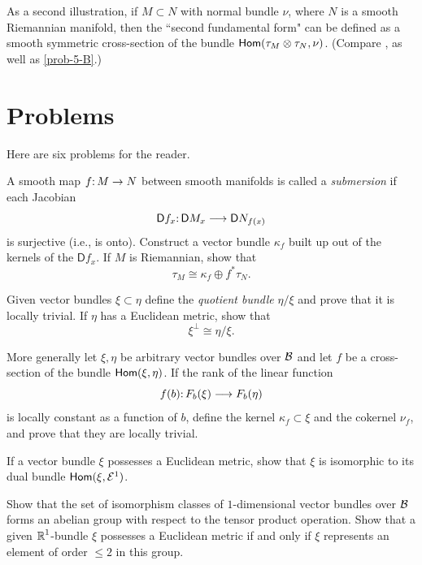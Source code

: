 As a second illustration, if $M\subset N$ with normal bundle $\nu$, where $N$
is a smooth Riemannian manifold, then the ``second fundamental form" can
be defined as a smooth symmetric cross-section of the bundle $\mathsf{Hom}(\tau_M\otimes\tau_N,\nu)$.
(Compare \cite{46}, as well as \cref{prob-5-B}.)













\section*{Problems}
Here are six problems for the reader.

\begin{problem}\label{prob-3-A}
	A smooth map $\map{f}{M}{N}$ between smooth manifolds is
	called a \textit{submersion} if each Jacobian
	\[\map{\mathsf{D}f_x}{\mathsf{D}M_x}{\mathsf{D}N_{f(x)}} \]
	is surjective (i.e., is onto). Construct a vector bundle $\kappa_f$ built up out of
	the kernels of the $\mathsf{D}f_x$. If $M$ is Riemannian, show that
	\[\tau_M\cong\kappa_f\oplus f^*\tau_N.\]
\end{problem}

\begin{problem}\label{prob-3-B}
	Given vector bundles $\xi\subset\eta$ define the \textit{quotient bundle}
	$\eta/\xi$ and prove that it is locally trivial. If $\eta$ has a Euclidean metric,
	show that
	\[\xi^\perp\cong\eta/\xi. \]
\end{problem}
\begin{problem}\label{prob-3-C}
	More generally let $\xi, \eta$ be arbitrary vector bundles over
	$\mathcal{B}$ and let $f$ be a cross-section of the bundle $\mathsf{Hom}(\xi, \eta)$. If the rank of
	the linear function
	\[\map{f(b)}{F_b(\xi)}{F_b(\eta)} \]
	is locally constant as a function of $b$, define the kernel $\kappa_f\subset\xi$ and the
	cokernel $\nu_f$, and prove that they are locally trivial.
\end{problem}

\begin{problem}\label{prob-3-D}
	If a vector bundle $\xi$ possesses a Euclidean metric,
	show that $\xi$ is isomorphic to its dual bundle $\mathsf{Hom}(\xi, \mathcal{E}^1)$.
\end{problem}

\begin{problem}\label{prob-3-E}
	Show that the set of isomorphism classes of $1$-dimensional vector bundles over $\mathcal{B}$ forms an abelian group with respect to the tensor product operation. Show that a given $\boldsymbol{\mathbb{R}}^1$-bundle $\xi$ possesses
	a Euclidean metric if and only if $\xi$ represents an element of order $\leq 2$
	in this group.
\end{problem}

